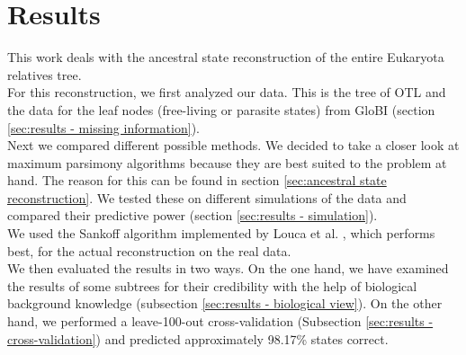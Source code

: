 \chapter{Results}
  This work deals with the ancestral state reconstruction of the entire Eukaryota relatives tree. \\

  For this reconstruction, we first analyzed our data. This is the tree of OTL \cite{Hinchliff2015}
    and the data for the leaf nodes (free-living or parasite states) from GloBI \cite{Poelen2014} 
    (section \ref{sec:results - missing information}). \\
  Next we compared different possible methods. We decided to take a closer look at maximum parsimony 
    algorithms because they are best suited to the problem at hand. The reason for this can be found 
    in section \ref{sec:ancestral state reconstruction}. We tested these on different simulations of 
    the data and compared their predictive power (section \ref{sec:results - simulation}). \\
  We used the Sankoff algorithm \cite{Sankoff1975} implemented by Louca et al. \cite{Louca2017}, 
    which performs best, for the actual reconstruction on the real data. \\

  We then evaluated the results in two ways. On the one hand, we have examined the results of some 
    subtrees for their credibility with the help of biological background knowledge (subsection 
    \ref{sec:results - biological view}). On the other hand, we performed a leave-100-out cross-validation
    (Subsection \ref{sec:results - cross-validation}) and predicted approximately 98.17\% states 
    correct.

  
%    
